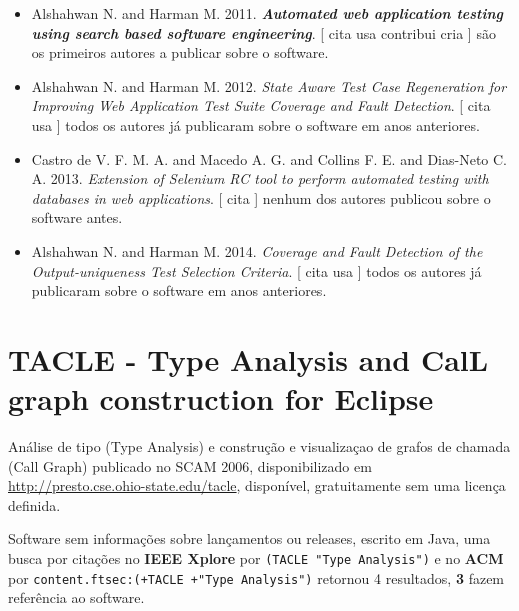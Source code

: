 \begin{itemize}
\item Alshahwan N. and Harman M.
      2011.
        \textbf{\textit{ Automated web application testing using search based software engineering}}.
      [
          cita
          usa
          contribui
          cria
      ]
são os primeiros autores a publicar sobre o software.
\item Alshahwan N. and Harman M.
      2012.
        \textit{ State Aware Test Case Regeneration for Improving Web Application Test Suite Coverage and Fault Detection}.
      [
          cita
          usa
      ]
todos os autores já publicaram sobre o software em anos anteriores.
\item Castro de V. F. M. A. and Macedo A. G. and Collins F. E. and Dias-Neto C. A.
      2013.
        \textit{ Extension of Selenium RC tool to perform automated testing with databases in web applications}.
      [
          cita
      ]
nenhum dos autores publicou sobre o software antes.
\item Alshahwan N. and Harman M.
      2014.
        \textit{ Coverage and Fault Detection of the Output-uniqueness Test Selection Criteria}.
      [
          cita
          usa
      ]
todos os autores já publicaram sobre o software em anos anteriores.
\end{itemize}
\section{TACLE - Type Analysis and CalL graph construction for Eclipse}

Análise de tipo (Type Analysis) e construção e visualizaçao de grafos de chamada (Call Graph)
publicado no SCAM 2006,
disponibilizado em \url{http://presto.cse.ohio-state.edu/tacle},
disponível,
gratuitamente
sem uma licença definida.

Software sem informações sobre lançamentos ou releases,
escrito em Java,
uma busca por citações no {\bf IEEE Xplore} por
\texttt{(TACLE "Type Analysis")}
e no {\bf ACM} por
\texttt{content.ftsec:(+TACLE +"Type Analysis")}
retornou
4 resultados,
{\bf 3} fazem referência ao software.


